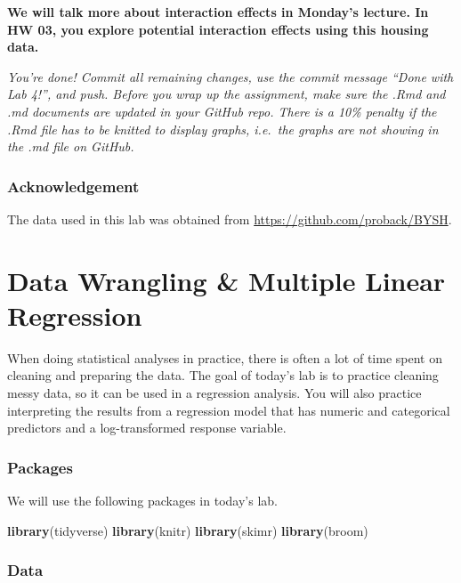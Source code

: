 \documentclass[]{book}
\newenvironment{Shaded}{\begin{snugshade}}{\end{snugshade}}
\newcommand{\KeywordTok}[1]{\textcolor[rgb]{0.13,0.29,0.53}{\textbf{#1}}}
\newcommand{\NormalTok}[1]{#1}
\begin{document}
\textbf{We will talk more about interaction effects in Monday's lecture.
In HW 03, you explore potential interaction effects using this housing
data.}

\emph{You're done! Commit all remaining changes, use the commit message
``Done with Lab 4!'', and push. Before you wrap up the assignment, make
sure the .Rmd and .md documents are updated in your GitHub repo. There
is a 10\% penalty if the .Rmd file has to be knitted to display graphs,
i.e.~the graphs are not showing in the .md file on GitHub.}

\subsection{Acknowledgement}\label{acknowledgement}

The data used in this lab was obtained from
\url{https://github.com/proback/BYSH}.

\chapter{Data Wrangling \& Multiple Linear Regression}\label{mlr2}

When doing statistical analyses in practice, there is often a lot of
time spent on cleaning and preparing the data. The goal of today's lab
is to practice cleaning messy data, so it can be used in a regression
analysis. You will also practice interpreting the results from a
regression model that has numeric and categorical predictors and a
log-transformed response variable.

\subsection{Packages}\label{packages-4}

We will use the following packages in today's lab.

\begin{Shaded}
\begin{Highlighting}[]
\KeywordTok{library}\NormalTok{(tidyverse)}
\KeywordTok{library}\NormalTok{(knitr)}
\KeywordTok{library}\NormalTok{(skimr)}
\KeywordTok{library}\NormalTok{(broom)}
\end{Highlighting}
\end{Shaded}

\subsection{Data}\label{data-4}
\end{document}
